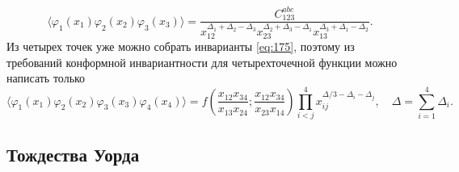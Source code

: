 \documentclass[a4paper,12pt]{article} \usepackage[utf8x]{inputenc} \usepackage[russian]{babel}
\theoremstyle{definition} \newtheorem{corollary}{Corollary}[theorem] \theoremstyle{definition}
\begin{document}
\begin{equation}
  \label{eq:196} \langle
\varphi_{1}(x_{1})\varphi_{2}(x_{2})\varphi_{3}(x_{3})\rangle=\frac{C^{abc}_{123}}{x_{12}^{\Delta_{1}+\Delta_{2}-\Delta_{3}}
x_{23}^{\Delta_{2}+\Delta_{3}-\Delta_{1}}x_{13}^{\Delta_{3}+\Delta_{1}-\Delta_{2}}}.
\end{equation} Из четырех точек уже можно собрать инварианты \eqref{eq:175}, поэтому из требований
конформной инвариантности для четырехточечной функции можно написать только
\begin{equation}
  \label{eq:197} \langle
\varphi_{1}(x_{1})\varphi_{2}(x_{2})\varphi_{3}(x_{3})\varphi_{4}(x_{4})\rangle=f\left(\frac{x_{12}x_{34}}{x_{13}x_{24}};
\frac{x_{12}x_{34}}{x_{23}x_{14}}\right)
\prod_{i<j}^{4}x_{ij}^{\Delta/3-\Delta_{i}-\Delta_{j}},\quad \Delta=\sum_{i=1}^{4}\Delta_{i}.
\end{equation}

\subsection{Тождества Уорда}
\label{sec:ward-identities}
\end{document}
